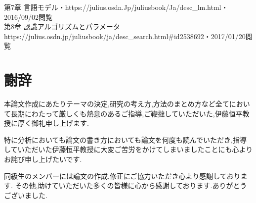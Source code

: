 \documentclass[12pt,oneside]{sotsuken_paper}
\begin{document}
\begin{thebibliography}{9}
 第7章 言語モデル・https://julius.osdn.Jp/juliusbook/Ja/desc\_lm.html・2016/09/02閲覧\\
 第8章 認識アルゴリズムとパラメータ https://julius.osdn.jp/juliusbook/ja/desc_search.html#id2538692・2017/01/20閲覧\\
\end{thebibliography}

\chapter*{謝辞}
本論文作成にあたりテーマの決定,研究の考え方,方法のまとめ方など全てにおいて長期にわたって厳しくも熱意のあるご指導,ご鞭撻していただいた,伊藤恒平教授に厚く御礼申し上げます.


特に分析においても論文の書き方においても論文を何度も読んでいただき,指導していただいた伊藤恒平教授に大変ご苦労をかけてしまいましたことにも心よりお詫び申し上げたいです.


同級生のメンバーには論文の作成,修正にご協力いただき心より感謝しております.
その他,助けていただいた多くの皆様に心から感謝しております.ありがとうございました.
\end{document}
